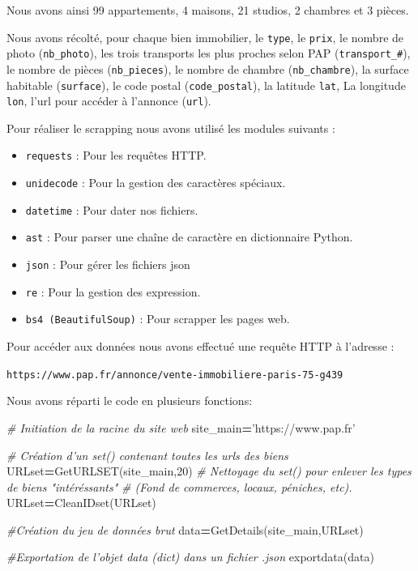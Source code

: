 \documentclass[french,]{article}
\newenvironment{Shaded}{\begin{snugshade}}{\end{snugshade}}
\newcommand{\CommentTok}[1]{\textcolor[rgb]{0.56,0.35,0.01}{\textit{#1}}}
\newcommand{\DecValTok}[1]{\textcolor[rgb]{0.00,0.00,0.81}{#1}}
\newcommand{\NormalTok}[1]{#1}
\newcommand{\OperatorTok}[1]{\textcolor[rgb]{0.81,0.36,0.00}{\textbf{#1}}}
\newcommand{\StringTok}[1]{\textcolor[rgb]{0.31,0.60,0.02}{#1}}
\providecommand{\tightlist}{%
  \setlength{\itemsep}{0pt}\setlength{\parskip}{0pt}}
\begin{document}
Nous avons ainsi 99 appartements, 4 maisons, 21 studios, 2 chambres et 3
pièces.

Nous avons récolté, pour chaque bien immobilier, le \texttt{type}, le
\texttt{prix}, le nombre de photo (\texttt{nb\_photo}), les trois
transports les plus proches selon PAP (\texttt{transport\_\#}), le
nombre de pièces (\texttt{nb\_pieces}), le nombre de chambre
(\texttt{nb\_chambre}), la surface habitable (\texttt{surface}), le code
postal (\texttt{code\_postal}), la latitude \texttt{lat}, La longitude
\texttt{lon}, l'url pour accéder à l'annonce (\texttt{url}).

Pour réaliser le scrapping nous avons utilisé les modules suivants :

\begin{itemize}
\tightlist
\item
  \texttt{requests} : Pour les requêtes HTTP.
\item
  \texttt{unidecode} : Pour la gestion des caractères spéciaux.
\item
  \texttt{datetime} : Pour dater nos fichiers.
\item
  \texttt{ast} : Pour parser une chaîne de caractère en dictionnaire
  Python.
\item
  \texttt{json} : Pour gérer les fichiers json
\item
  \texttt{re} : Pour la gestion des expression.
\item
  \texttt{bs4\ (BeautifulSoup)} : Pour scrapper les pages web.
\end{itemize}

Pour accéder aux données nous avons effectué une requête HTTP à
l'adresse :

\texttt{https://www.pap.fr/annonce/vente-immobiliere-paris-75-g439}

Nous avons réparti le code en plusieurs fonctions:

\begin{Shaded}
\begin{Highlighting}[]
\CommentTok{# Initiation de la racine du site web}
\NormalTok{site_main}\OperatorTok{=}\StringTok{'https://www.pap.fr'}

\CommentTok{# Création d'un set() contenant toutes les urls des biens}
\NormalTok{URLset}\OperatorTok{=}\NormalTok{GetURLSET(site_main,}\DecValTok{20}\NormalTok{)}
\CommentTok{# Nettoyage du set() pour enlever les types de biens "intéréssants"}
\CommentTok{# (Fond de commerces, locaux, péniches, etc).}
\NormalTok{URLset}\OperatorTok{=}\NormalTok{CleanIDset(URLset)}

\CommentTok{#Création du jeu de données brut}
\NormalTok{data}\OperatorTok{=}\NormalTok{GetDetails(site_main,URLset)}

\CommentTok{#Exportation de l'objet data (dict) dans un fichier .json }
\NormalTok{exportdata(data)  }
\end{Highlighting}
\end{Shaded}
\end{document}
